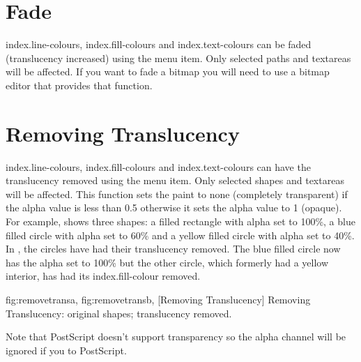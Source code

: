 
\section{Fade}\label{sec:fade}


\Glspl{index.line-colour}, \glspl{index.fill-colour} and
\glspl{index.text-colour} can be faded (\gls{translucency} increased)
using the  menu item. Only selected
\glspl{path} and \glspl{textarea} will be affected. If you want to
fade a \gls{bitmap} you will need to use a bitmap editor that
provides that function.


\section{Removing Translucency}\label{sec:removetrans}


\Glspl{index.line-colour}, \glspl{index.fill-colour} and
\glspl{index.text-colour} can have the \gls{translucency} removed using
the  menu item. Only selected
\glspl{shape} and \glspl{textarea} will be affected. This function
sets the paint to none (completely \gls{transparent}) if the alpha value
is less than 0.5 otherwise it sets the alpha value to 1 (opaque).
For example,  shows three shapes: a
filled rectangle with alpha set to 100\%, a blue filled circle with
alpha set to 60\% and a yellow filled circle with alpha set to 40\%.
In , the circles have had their
translucency removed. The blue filled circle now has the alpha set
to 100\% but the other circle, which formerly had a yellow interior,
has had its \gls{index.fill-colour} removed.

{
 {fig:removetransa}{}{},
 {fig:removetransb}{}{},
}
[Removing Translucency]
{Removing Translucency:  original shapes;
   translucency removed.}

\begin{warning}
Note that PostScript doesn't support transparency so the
alpha channel will be ignored if you  to PostScript.
\end{warning}


